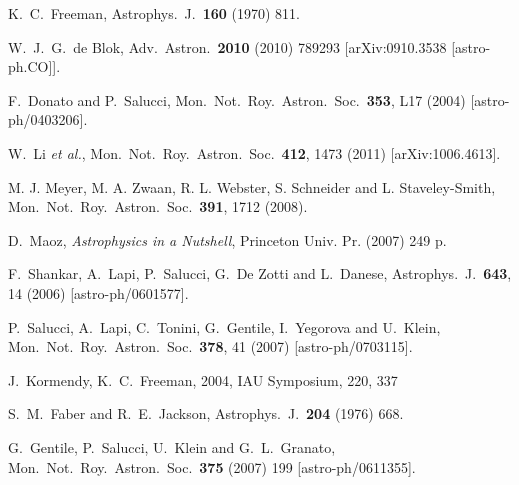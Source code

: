 \documentclass[12pt]{article}
\begin{document}
{{\begin{thebibliography}{999}
  K.~C.~Freeman,
  Astrophys.\ J.\  {\bf 160} (1970) 811.

  W.~J.~G.~de Blok,
  Adv.\ Astron.\  {\bf 2010} (2010) 789293
  [arXiv:0910.3538 [astro-ph.CO]].
  
 F.~Donato and P.~Salucci,
 Mon.\ Not.\ Roy.\ Astron.\ Soc.\  {\bf 353}, L17 (2004) [astro-ph/0403206].
 
W.~Li {\it et al.}, 
Mon.\ Not.\ Roy.\ Astron.\ Soc.\  {\bf 412}, 1473 (2011) [arXiv:1006.4613].
  
 M. J. Meyer, M. A. Zwaan, R. L. Webster, S. Schneider and L. Staveley-Smith,
 Mon.\ Not.\ Roy.\ Astron.\ Soc.\  {\bf 391}, 1712 (2008).
 
  D.~Maoz,
  {\it Astrophysics in a Nutshell},
  Princeton Univ. Pr. (2007) 249 p.

 F.~Shankar, A.~Lapi, P.~Salucci, G.~De Zotti and L.~Danese,
 Astrophys.\ J.\  {\bf 643}, 14 (2006)
 [astro-ph/0601577].

P.~Salucci, A.~Lapi, C.~Tonini, G.~Gentile, I.~Yegorova and U.~Klein,
Mon.\ Not.\ Roy.\ Astron.\ Soc.\  {\bf 378}, 41 (2007) [astro-ph/0703115].

 J.~Kormendy, K.~C.~Freeman, 2004, IAU Symposium, 220, 337

  S.~M.~Faber and R.~E.~Jackson,
  Astrophys.\ J.\  {\bf 204} (1976) 668.
  
  G.~Gentile, P.~Salucci, U.~Klein and G.~L.~Granato,
  Mon.\ Not.\ Roy.\ Astron.\ Soc.\  {\bf 375} (2007) 199
  [astro-ph/0611355].
  

\end{thebibliography}}}
\end{document}
